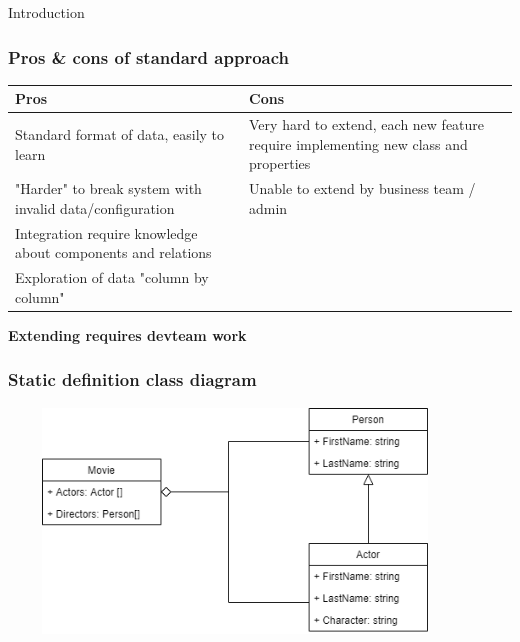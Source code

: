 \documentclass{beamer}
\begin{document}
\begin{section}{Introduction}
\begin{frame}
\frametitle{Pros \& cons of standard approach}

\begin{center}

\begin{tabular}{ | m{5.2cm} |  m{5.2cm} | }

\hline
 Pros & Cons \\ 
\hline \hline
Standard format of data, easily to learn & Very hard to extend, each new feature require implementing new class and properties \\  
\hline
 "Harder" to break system with invalid data/configuration & Unable to extend by business team / admin \\
\hline
Integration require knowledge about components and relations & \\ 
\hline
Exploration of data "column by column" & \\
\hline

\end{tabular}

 \pause \textbf{Extending requires devteam work}

\end{center}

\end{frame}


\begin{frame}
\frametitle{Static definition class diagram}
\centering
 \includegraphics[width=12cm, height=6cm]{Standard.png}
\end{frame}

\end{section}
\end{document}
